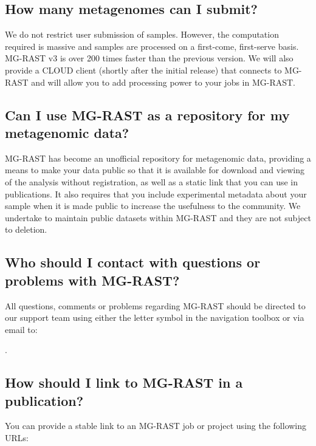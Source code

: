 \documentclass[letterpaper,10pt,english]{sphinxmanual}
\begin{document}
\subsection{How many metagenomes can I submit?}
\label{\detokenize{faq:how-many-metagenomes-can-i-submit}}
We do not restrict user submission of samples. However, the computation
required is massive and samples are processed on a first-come,
first-serve basis. MG-RAST v3 is over 200 times faster than the previous
version. We will also provide a CLOUD client (shortly after the initial
release) that connects to MG-RAST and will allow you to add processing
power to your jobs in MG-RAST.


\subsection{Can I use MG-RAST as a repository for my metagenomic data?}
\label{\detokenize{faq:can-i-use-mg-rast-as-a-repository-for-my-metagenomic-data}}
MG-RAST has become an unofficial repository for metagenomic data,
providing a means to make your data public so that it is available for
download and viewing of the analysis without registration, as well as a
static link that you can use in publications. It also requires that you
include experimental metadata about your sample when it is made public
to increase the usefulness to the community. We undertake to maintain
public datasets within MG-RAST and they are not subject to deletion.


\subsection{Who should I contact with questions or problems with MG-RAST?}
\label{\detokenize{faq:who-should-i-contact-with-questions-or-problems-with-mg-rast}}
All questions, comments or problems regarding MG-RAST should be directed
to our support team using either the letter symbol in the navigation
toolbox or via email to:


.


\subsection{How should I link to MG-RAST in a publication?}
\label{\detokenize{faq:how-should-i-link-to-mg-rast-in-a-publication}}
You can provide a stable link to an MG-RAST job or project using the
following URLs:
\end{document}

